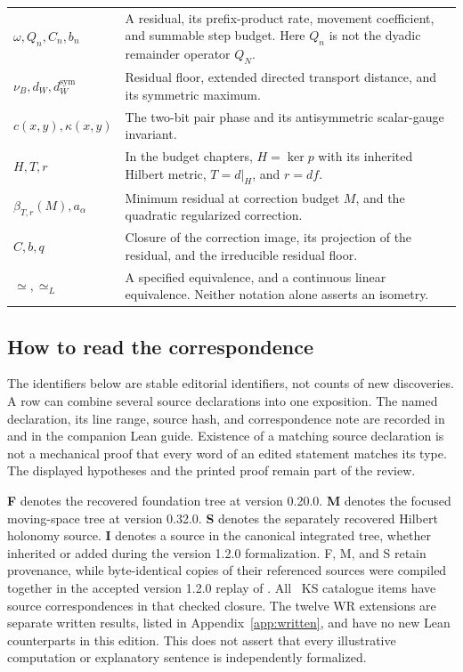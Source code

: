 \begin{longtable}{@{}p{.25\linewidth}p{.7\linewidth}@{}}
\(\omega,Q_n,C_n,b_n\) & A residual, its prefix-product rate, movement coefficient, and summable step budget. Here $Q_n$ is not the dyadic remainder operator $Q_N$.\\
\(\nu_B,d_W,d_W^{\mathrm{sym}}\) & Residual floor, extended directed transport distance, and its symmetric maximum.\\
\(c(x,y),\kappa(x,y)\) & The two-bit pair phase and its antisymmetric scalar-gauge invariant.\\
\(H,T,r\) & In the budget chapters, $H=\ker p$ with its inherited Hilbert metric, $T=d|_H$, and $r=df$.\\
\(\beta_{T,r}(M),a_\alpha\) & Minimum residual at correction budget $M$, and the quadratic regularized correction.\\
\(C,b,q\) & Closure of the correction image, its projection of the residual, and the irreducible residual floor.\\
\(\simeq,\simeq_L\) & A specified equivalence, and a continuous linear equivalence. Neither notation alone asserts an isometry.\\
\bottomrule
\end{longtable}

\subsection{How to read the correspondence}
The identifiers below are stable editorial identifiers, not counts of new discoveries. A row can combine several source declarations into one exposition. The named declaration, its line range, source hash, and correspondence note are recorded in  and in the companion Lean guide. Existence of a matching source declaration is not a mechanical proof that every word of an edited statement matches its type. The displayed hypotheses and the printed proof remain part of the review.

\textbf{F} denotes the recovered foundation tree at version 0.20.0. \textbf{M} denotes the focused moving-space tree at version 0.32.0. \textbf{S} denotes the separately recovered Hilbert holonomy source. \textbf{I} denotes a source in the canonical integrated tree, whether inherited or added during the version 1.2.0 formalization. F, M, and S retain provenance, while byte-identical copies of their referenced sources were compiled together in the accepted version 1.2.0 replay of . All \EditionClaims\ KS catalogue items have source correspondences in that checked closure. The twelve WR extensions are separate written results, listed in Appendix~\ref{app:written}, and have no new Lean counterparts in this edition. This does not assert that every illustrative computation or explanatory sentence is independently formalized.

